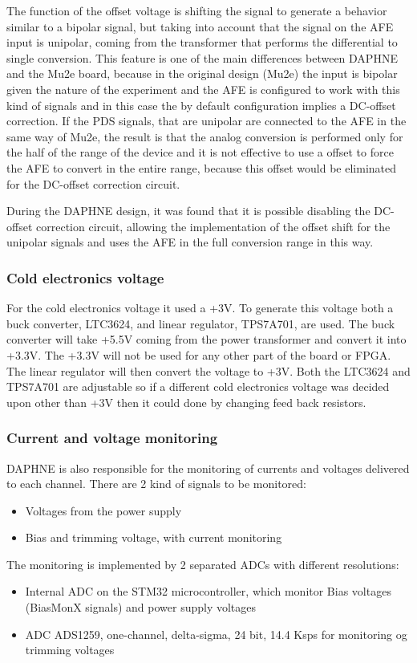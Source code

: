 The function of the offset voltage is shifting the signal to generate a behavior similar to a bipolar signal, but taking into account that the signal on the AFE input is unipolar, coming from the transformer that performs the differential to single conversion. This feature is one of the main differences between DAPHNE and the Mu2e board, because in the original design (Mu2e) the input is bipolar given the nature of the experiment and the AFE is configured to work with this kind of signals and in this case the by default configuration implies a DC-offset correction. 
If the PDS signals, that are unipolar are connected to the AFE in the same way of Mu2e, the result is that the analog conversion is performed only for the half of the range of the device and it is not effective to use a offset to force the AFE to convert in the entire range, because this offset would be eliminated for the DC-offset correction circuit.

During the DAPHNE design, it was found that it is possible disabling the DC-offset correction circuit, allowing the implementation of the offset shift for the unipolar signals and uses the AFE in the full conversion range in this way. 

\subsubsection{Cold electronics voltage}

 For the cold electronics voltage it used a +3V. To generate this voltage both a buck converter, LTC3624, and linear regulator, TPS7A701, are used. The buck converter will take +5.5V coming from the power transformer and convert it into +3.3V. The +3.3V will not be used for any other part of the board or FPGA. The linear regulator will then convert the voltage to +3V. Both the LTC3624 and TPS7A701 are adjustable so if a different cold electronics voltage was decided upon other than +3V then it could done by changing feed back resistors.

\subsubsection{Current and voltage monitoring}

DAPHNE is also responsible for the monitoring of currents and voltages delivered to each channel. There are 2 kind of signals to be monitored:

\begin{itemize}
  \item Voltages from the power supply
\item Bias and trimming voltage, with current monitoring
\end{itemize}
The monitoring is implemented by 2 separated ADCs with different resolutions:
\begin{itemize}
    \item Internal ADC on the STM32 microcontroller, which monitor Bias voltages (BiasMonX signals) and power supply voltages
\item ADC ADS1259, one-channel, delta-sigma, 24 bit, 14.4 Ksps for monitoring og trimming voltages %
\end{itemize}

